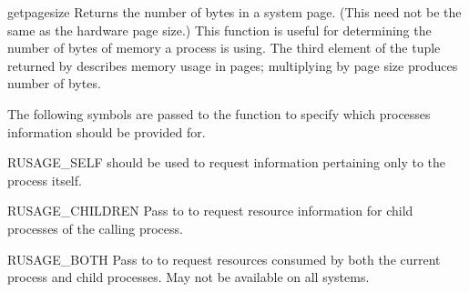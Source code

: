 \begin{funcdesc}{getpagesize}{}
  Returns the number of bytes in a system page. (This need not be the
  same as the hardware page size.) This function is useful for
  determining the number of bytes of memory a process is using. The
  third element of the tuple returned by  describes
  memory usage in pages; multiplying by page size produces number of
  bytes. 
\end{funcdesc}

The following  symbols are passed to the
 function to specify which processes information
should be provided for.

\begin{datadesc}{RUSAGE_SELF}
   should be used to
  request information pertaining only to the process itself.
\end{datadesc}

\begin{datadesc}{RUSAGE_CHILDREN}
  Pass to  to request resource information for
  child processes of the calling process.
\end{datadesc}

\begin{datadesc}{RUSAGE_BOTH}
  Pass to  to request resources consumed by both
  the current process and child processes.  May not be available on all
  systems.
\end{datadesc}
